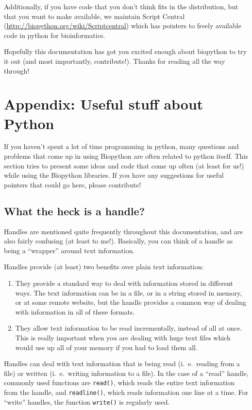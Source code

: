\documentclass{report}
\begin{document}
Additionally, if you have code that you don't think fits in the
distribution, but that you want to make available, we maintain Script
Central (\url{http://biopython.org/wiki/Scriptcentral}) 
which has pointers to freely available code in python for bioinformatics.


Hopefully this documentation has got you excited enough about
biopython to try it out (and most importantly, contribute!). Thanks
for reading all the way through!

\chapter{Appendix: Useful stuff about Python}
\label{sec:appendix}

If you haven't spent a lot of time programming in python, many
questions and problems that come up in using Biopython are often
related to python itself. This section tries to present some ideas and 
code that come up often (at least for us!) while using the Biopython
libraries. If you have any suggestions for useful pointers that could
go here, please contribute!

\section{What the heck is a handle?}
\label{sec:appendix-handles}

Handles are mentioned quite frequently throughout this documentation,
and are also fairly confusing (at least to me!). Basically, you can
think of a handle as being a ``wrapper'' around text information.


Handles provide (at least) two benefits over plain text information:

\begin{enumerate}
  \item They provide a standard way to deal with information stored in 
  different ways. The text information can be in a file, or in a
  string stored in memory, or at some remote website, but the handle
  provides a common way of dealing with information in all of these
  formats. 

  \item They allow text information to be read incrementally, instead
  of all at once. This is really important when you are dealing with
  huge text files which would use up all of your memory if you had to
  load them all.
\end{enumerate}

Handles can deal with text information that is being read (i.~e.~reading 
from a file) or written (i.~e.~writing information to a file). In the
case of a ``read'' handle, commonly used functions are \verb|read()|,
which reads the entire text information from the handle, and
\verb|readline()|, which reads information one line at a time. For
``write'' handles, the function \verb|write()| is regularly used.
\end{document}
